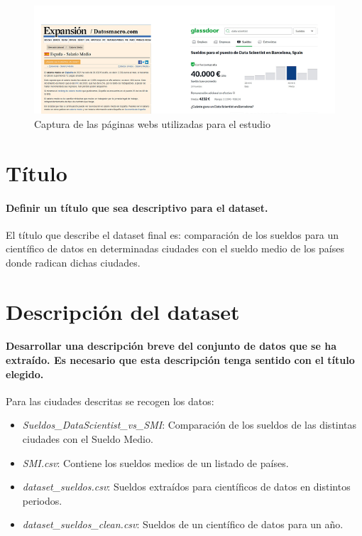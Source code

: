 \documentclass[IB]{PlantillaPACnova_Est}
\begin{document}
\begin{figure}[h]
\includegraphics{fuentes.png}
\caption{Captura de las páginas webs utilizadas para el estudio}
\end{figure}

\newpage 
\section{Título}
\paragraph{Definir un título que sea descriptivo para el dataset.\\}

El título que describe el dataset final es: comparación de los sueldos para un científico de datos en determinadas ciudades con el sueldo medio de los países donde radican dichas ciudades.

\section{Descripción del dataset}
\paragraph{Desarrollar una descripción breve del conjunto de datos que se ha extraído. Es necesario que esta descripción tenga sentido con el título elegido.\\}

Para las ciudades descritas se recogen los datos:
\begin{itemize}
\item \textit{Sueldos\_DataScientist\_vs\_SMI}: Comparación de los sueldos de las distintas ciudades con el Sueldo Medio.
\item \textit{SMI.csv}: Contiene los sueldos medios de un listado de países.
\item \textit{dataset\_sueldos.csv}: Sueldos extraídos para científicos de datos en distintos periodos.
\item \textit{dataset\_sueldos\_clean.csv}: Sueldos de un científico de datos para un año.
\end{itemize}
\end{document}
